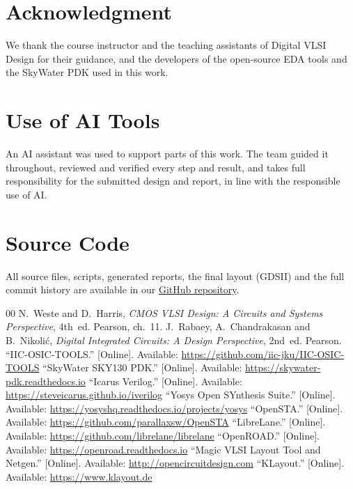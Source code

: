 \documentclass[conference]{IEEEtran}
\begin{document}
\section*{Acknowledgment}
We thank the course instructor and the teaching assistants of Digital VLSI Design for their guidance, and
the developers of the open-source EDA tools and the SkyWater PDK used in this work.

\section*{Use of AI Tools}
An AI assistant was used to support parts of this work. The team guided it throughout, reviewed and verified
every step and result, and takes full responsibility for the submitted design and report, in line with the
responsible use of AI.

\section*{Source Code}
All source files, scripts, generated reports, the final layout (GDSII) and the full commit history are
available in our \href{https://github.com/VaNsH-IIIT/DVD-A1-array-multiplier}{GitHub repository}.

\begin{thebibliography}{00}
N.~Weste and D.~Harris, \emph{CMOS VLSI Design: A Circuits and Systems Perspective}, 4th~ed. Pearson,
ch.~11.
J.~Rabaey, A.~Chandrakasan and B.~Nikoli\'c, \emph{Digital Integrated Circuits: A Design Perspective},
2nd~ed. Pearson.
``IIC-OSIC-TOOLS.'' [Online]. Available: \url{https://github.com/iic-jku/IIC-OSIC-TOOLS}
``SkyWater SKY130 PDK.'' [Online]. Available: \url{https://skywater-pdk.readthedocs.io}
``Icarus Verilog.'' [Online]. Available: \url{https://steveicarus.github.io/iverilog}
``Yosys Open SYnthesis Suite.'' [Online]. Available: \url{https://yosyshq.readthedocs.io/projects/yosys}
``OpenSTA.'' [Online]. Available: \url{https://github.com/parallaxsw/OpenSTA}
``LibreLane.'' [Online]. Available: \url{https://github.com/librelane/librelane}
``OpenROAD.'' [Online]. Available: \url{https://openroad.readthedocs.io}
``Magic VLSI Layout Tool and Netgen.'' [Online]. Available: \url{http://opencircuitdesign.com}
``KLayout.'' [Online]. Available: \url{https://www.klayout.de}
\end{thebibliography}
\end{document}

